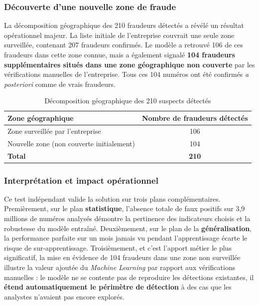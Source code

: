 \documentclass[12pt, oneside, a4paper]{report}
\begin{document}
\subsubsection{Découverte d'une nouvelle zone de fraude}
La décomposition géographique des 210 fraudeurs détectés a révélé un
résultat opérationnel majeur. La liste initiale de l'entreprise couvrait
une seule zone surveillée, contenant 207 fraudeurs confirmés. Le modèle
a retrouvé 106 de ces fraudeurs dans cette zone connue, mais a
également signalé \textbf{104 fraudeurs supplémentaires situés dans une
zone géographique non couverte} par les vérifications manuelles de
l'entreprise. Tous ces 104 numéros ont été confirmés \emph{a posteriori}
comme de vrais fraudeurs.

\begin{table}[H]
\centering
\caption{Décomposition géographique des 210 suspects détectés}
\label{tab:fresh-zones}
\vspace{0.3cm}
\renewcommand{\arraystretch}{1.3}
\begin{tabular}{|l|c|}
\hline
\textbf{Zone géographique} & \textbf{Nombre de fraudeurs détectés} \\
\hline
Zone surveillée par l'entreprise & 106 \\
\hline
Nouvelle zone (non couverte initialement) & 104 \\
\hline
\textbf{Total} & \textbf{210} \\
\hline
\end{tabular}
\end{table}

\subsubsection{Interprétation et impact opérationnel}
Ce test indépendant valide la solution sur trois plans complémentaires.
Premièrement, sur le plan \textbf{statistique}, l'absence totale de faux
positifs sur 3,9 millions de numéros analysés démontre la pertinence
des indicateurs choisis et la robustesse du modèle entraîné.
Deuxièmement, sur le plan de la \textbf{généralisation}, la performance
parfaite sur un mois jamais vu pendant l'apprentissage écarte le risque
de sur-apprentissage. Troisièmement, et c'est l'apport métier le plus
significatif, la mise en évidence de 104 fraudeurs dans une zone non
surveillée illustre la valeur ajoutée du \emph{Machine Learning} par
rapport aux vérifications manuelles : le modèle ne se contente pas de
reproduire les détections existantes, il \textbf{étend automatiquement
le périmètre de détection} à des cas que les analystes n'avaient pas
encore explorés.
\end{document}
